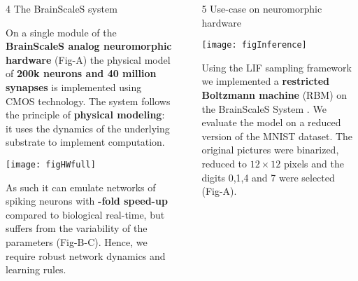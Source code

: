 \begin{frame}
\begin{columns}
\begin{column}{0.99\textwidth}
\begin{columns}[t]
\begin{column}{0.32\textwidth}
\begin{block}{\large 4 The BrainScaleS system}
					\justifying
					\begin{adjustwidth}{1.cm}{1.cm}
					 On a single module of the \textbf{BrainScaleS \cite{schemmel2010wafer} analog neuromorphic hardware} (Fig-A) the physical model of \textbf{200k neurons and 40 million synapses} is implemented using CMOS technology.
					 The system follows the principle of \textbf{physical modeling}: it uses the dynamics of the underlying substrate to implement computation.
					 
					\end{adjustwidth}

					\vspace{1.cm}
					\begin{center}
						\texttt{[image: figHWfull]}
					\end{center}

					\begin{adjustwidth}{1cm}{1cm}
					As such it can emulate networks of spiking neurons with \textbf{-fold speed-up} compared to biological real-time, but suffers from the variability of the parameters (Fig-B-C).
					Hence, we require robust network dynamics and learning rules.

					\end{adjustwidth}

					\blockSpaceOne
					\end{block}




				\end{column}

				\begin{column}{.01\textwidth}\end{column}

				\begin{column}{0.32\textwidth}

					\begin{block}{\large 5 Use-case on neuromorphic hardware}
					\blockSpaceTwo

					\begin{center}
						\texttt{[image: figInference]}
					\end{center}
					\thirdBlockImSpace

					\begin{adjustwidth}{1.cm}{1.cm}
					\justify
					 Using the LIF sampling framework we implemented a \textbf{restricted Boltzmann machine} (RBM) \cite{hinton1984boltzmann} on the BrainScaleS System \cite{kungl2019accelerated}.
					 We evaluate the model on a reduced version of the MNIST dataset.
					 The original pictures were binarized, reduced to $12\times12$ pixels and the digits 0,1,4 and 7 were selected (Fig-A).
					\end{adjustwidth}


\end{block}
\end{column}
\end{columns}
\end{column}
\end{columns}
\end{frame}
